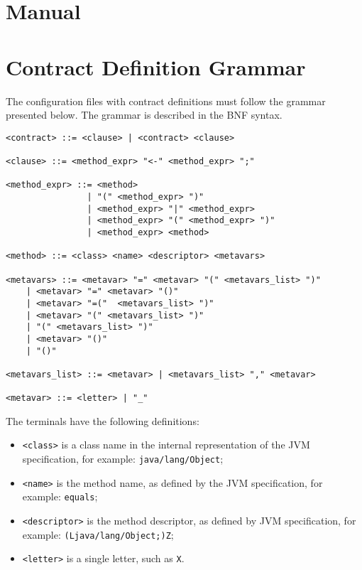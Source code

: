 \chapter{Manual}
\label{manual}


\chapter{Contract Definition Grammar}
\label{appGrammar}

The configuration files with contract definitions must follow the grammar
presented below. The grammar is described in the BNF syntax.

\begin{lstlisting}
<contract> ::= <clause> | <contract> <clause>

<clause> ::= <method_expr> "<-" <method_expr> ";"

<method_expr> ::= <method>
                | "(" <method_expr> ")"
                | <method_expr> "|" <method_expr>
                | <method_expr> "(" <method_expr> ")"
                | <method_expr> <method>

<method> ::= <class> <name> <descriptor> <metavars>

<metavars> ::= <metavar> "=" <metavar> "(" <metavars_list> ")"
    | <metavar> "=" <metavar> "()" 
    | <metavar> "=("  <metavars_list> ")"
    | <metavar> "(" <metavars_list> ")"
    | "(" <metavars_list> ")"
    | <metavar> "()" 
    | "()"

<metavars_list> ::= <metavar> | <metavars_list> "," <metavar>

<metavar> ::= <letter> | "_"
\end{lstlisting}

The terminals have the following definitions:
\begin{itemize}
    \item \texttt{<class>} is a class name in the internal representation of
        the JVM specification, for example: \texttt{java/lang/Object};
    \item \texttt{<name>} is the method name, as defined by the JVM
        specification, for example: \texttt{equals};
    \item \texttt{<descriptor>} is the method descriptor, as defined by JVM
        specification, for example: \texttt{(Ljava/lang/Object;)Z};
    \item \texttt{<letter>} is a single letter, such as \texttt{X}.
\end{itemize}

